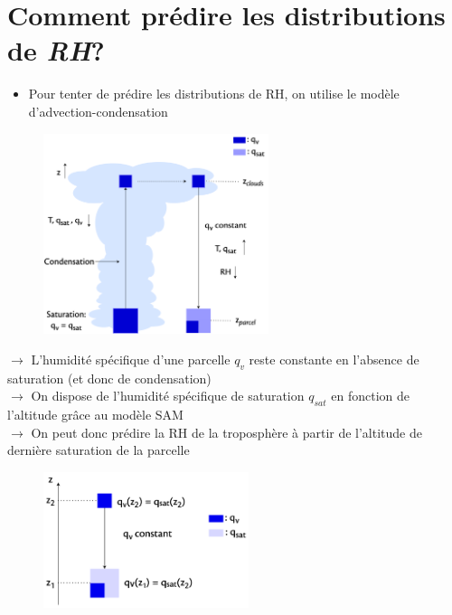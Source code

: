 \documentclass[10pt]{beamer}
\begin{document}
\section*{Comment prédire les distributions de \textit{RH}?}
\begin{frame}{\secname}
     \begin{itemize}
         \item Pour tenter de prédire les distributions de RH, on utilise le modèle d'advection-condensation \autocite{pierrehumbertRelativeHumidityAtmosphere2007,Vallis2017}
     \end{itemize}
     \begin{figure}[hbtp]
         \centering
         \includegraphics[width=6.6cm]{Figures/advec-condens.png}
     \end{figure}
\end{frame}

\begin{frame}{\secname}
    $\rightarrow$ L'humidité spécifique d'une parcelle $q_v$ reste constante en l'absence de saturation (et donc de condensation) \\ \vspace{0.2cm}
    $\rightarrow$ On dispose de l'humidité spécifique de saturation $q_{sat}$ en fonction de l'altitude grâce au modèle SAM  \\ \vspace{0.2cm}
    $\rightarrow$ On peut donc prédire la RH de la troposphère à partir de l'altitude de dernière saturation de la parcelle
    \begin{figure}[hbtp]
        \centering
        \includegraphics[width=6cm]{Figures/lsadraw.png}
    \end{figure}
\end{frame}
\end{document}

